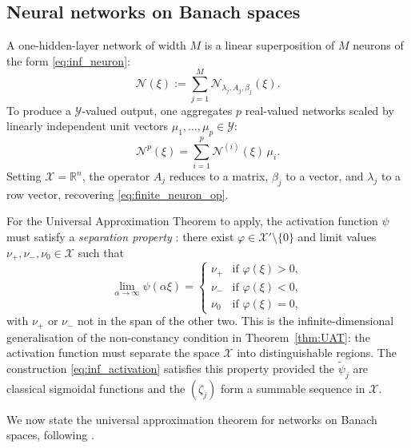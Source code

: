\subsection{Neural networks on Banach spaces}
 
A one-hidden-layer network of width $M$ is a linear superposition of $M$ neurons of the form \eqref{eq:inf_neuron}:
\begin{equation}
    \mathcal{N}(\xi)
    :=
    \sum_{j=1}^M
    \mathcal{N}_{\lambda_j, A_j, \beta_j}(\xi).
\label{eq:inf_network}
\end{equation}
To produce a $\mathcal{Y}$-valued output, one aggregates $p$ real-valued networks scaled by linearly independent unit vectors $\mu_1, \ldots, \mu_p \in \mathcal{Y}$:
\begin{equation}
    \mathcal{N}^p(\xi)
    =
    \sum_{i=1}^p \mathcal{N}^{(i)}(\xi)\,\mu_i.
\label{eq:inf_network_Y}
\end{equation}
Setting $\mathcal{X} = \mathbb{R}^n$, the operator $A_j$ reduces to a matrix, $\beta_j$ to a vector, and $\lambda_j$ to a row vector, recovering
\eqref{eq:finite_neuron_op}.

For the Universal Approximation Theorem to apply, the activation function $\psi$ must satisfy a \emph{separation property} \citep{Benth2024}: there exist $\varphi \in \mathcal{X}' \setminus \{0\}$ and limit values $\nu_+, \nu_-, \nu_0 \in \mathcal{X}$ such that
\begin{equation}
    \lim_{\alpha \to \infty} \psi(\alpha \xi)
    =
    \begin{cases}
        \nu_+ & \text{if } \varphi(\xi) > 0, \\
        \nu_- & \text{if } \varphi(\xi) < 0, \\
        \nu_0 & \text{if } \varphi(\xi) = 0,
    \end{cases}
\label{eq:separation}
\end{equation}
with $\nu_+$ or $\nu_-$ not in the span of the other two. This is the infinite-dimensional generalisation of the non-constancy condition in Theorem~\ref{thm:UAT}: the activation function must separate the space $\mathcal{X}$ into distinguishable regions. The construction \eqref{eq:inf_activation} satisfies this property provided the $\tilde{\psi}_j$ are classical sigmoidal functions and the $(\zeta_j)$ form a summable sequence in $\mathcal{X}$.

We now state the universal approximation theorem for networks on Banach spaces, following \citet{Benth2024}.

